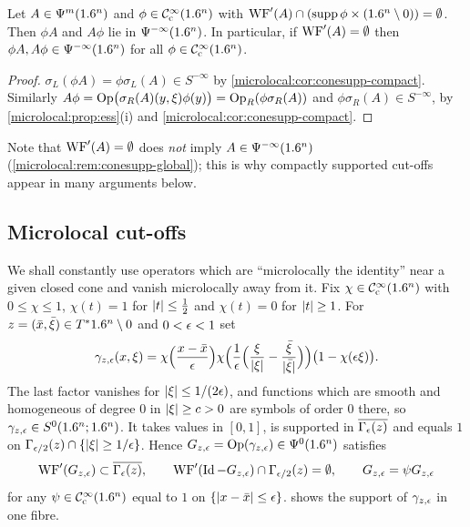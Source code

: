 \begin{lemma}\label{microlocal:lem:localize}
  Let $A\in\Psi^{m}(1.6^n)$ and $\phi\in\mathcal{C}^\infty_{\mathrm{c}}(1.6^n)$ with
  $\operatorname{WF}'(A)\cap(\operatorname{supp}\phi\times(1.6^n\setminus0))=\emptyset$. Then $\phi A$ and
  $A\phi$ lie in $\Psi^{-\infty}(1.6^n)$. In particular, if $\operatorname{WF}'(A)=\emptyset$
  then $\phi A,A\phi\in\Psi^{-\infty}(1.6^n)$ for all $\phi\in\mathcal{C}^\infty_{\mathrm{c}}(1.6^n)$.
\end{lemma}
\begin{proof}
  $\sigma_L(\phi A)=\phi\sigma_L(A)\in S^{-\infty}$ by
  \cref{microlocal:cor:conesupp-compact}. Similarly
  $A\phi=\operatorname{Op}\bigl(\sigma_R(A)(y,\xi)\phi(y)\bigr)=\operatorname{Op}_R(\phi\sigma_R(A))$ and
  $\phi\sigma_R(A)\in S^{-\infty}$, by
  \cref{microlocal:prop:ess}(i) and \cref{microlocal:cor:conesupp-compact}.
\end{proof}

Note that $\operatorname{WF}'(A)=\emptyset$ does \emph{not} imply
$A\in\Psi^{-\infty}(1.6^n)$ (\cref{microlocal:rem:conesupp-global}); this is
why compactly supported cut-offs appear in many arguments below.

\subsection{Microlocal cut-offs}
We shall constantly use operators which are ``microlocally the identity''
near a given closed cone and vanish microlocally away from it. Fix
$\chi\in\mathcal{C}^\infty_{\mathrm{c}}(1.6^n)$ with $0\le\chi\le1$, $\chi(t)=1$ for $\lvert t\rvert\le\frac12$ and
$\chi(t)=0$ for $\lvert t\rvert\ge1$. For $z=(\bar x,\bar\xi)\in T^*1.6^n\setminus0$ and
$0<\epsilon<1$ set
\begin{equation}\label{microlocal:eq:gamma}
  \gamma_{z,\epsilon}(x,\xi)=\chi\Bigl(\frac{x-\bar x}{\epsilon}\Bigr)
  \chi\Bigl(\frac1{\epsilon}\Bigl(\frac\xi{\lvert \xi\rvert}-\frac{\bar\xi}{\lvert \bar\xi\rvert}\Bigr)\Bigr)
  \bigl(1-\chi(\epsilon\xi)\bigr).
\end{equation}
The last factor vanishes for $\lvert \xi\rvert\le1/(2\epsilon)$, and functions which are
smooth and homogeneous of degree $0$ in $\lvert \xi\rvert\ge c>0$ are symbols of
order $0$ there, so $\gamma_{z,\epsilon}\in S^0(1.6^n;1.6^n)$. It takes values in
$[0,1]$, is supported in $\overline{\Gamma_\epsilon(z)}$ and equals $1$ on
$\Gamma_{\epsilon/2}(z)\cap\{\lvert \xi\rvert\ge1/\epsilon\}$. Hence
$G_{z,\epsilon}=\operatorname{Op}(\gamma_{z,\epsilon})\in\Psi^{0}(1.6^n)$ satisfies
\begin{equation}\label{microlocal:eq:G-cutoff}
  \operatorname{WF}'(G_{z,\epsilon})\subset\overline{\Gamma_\epsilon(z)},\qquad
  \operatorname{WF}'(\operatorname{Id}-G_{z,\epsilon})\cap\Gamma_{\epsilon/2}(z)=\emptyset,\qquad
  G_{z,\epsilon}=\psi G_{z,\epsilon}
\end{equation}
for any $\psi\in\mathcal{C}^\infty_{\mathrm{c}}(1.6^n)$ equal to $1$ on $\{\lvert x-\bar x\rvert\le\epsilon\}$.
 shows the support of $\gamma_{z,\epsilon}$ in one fibre.

